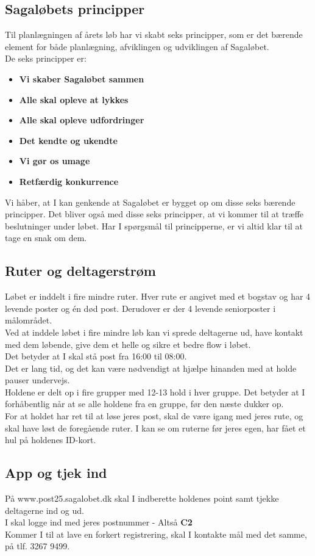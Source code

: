 \subsection{Sagaløbets principper}
Til planlægningen af årets løb har vi skabt seks principper, som er det bærende element for både planlægning, afviklingen og udviklingen af Sagaløbet.\\
De seks principper er:
\begin{itemize}
  \item \textbf{Vi skaber Sagaløbet sammen}
  \item \textbf{Alle skal opleve at lykkes}
  \item \textbf{Alle skal opleve udfordringer}
  \item \textbf{Det kendte og ukendte}
  \item \textbf{Vi gør os umage}
  \item \textbf{Retfærdig konkurrence}
\end{itemize}
Vi håber, at I kan genkende at Sagaløbet er bygget op om disse seks bærende principper. Det bliver også med disse seks principper, at vi kommer til at træffe beslutninger under løbet. Har I spørgsmål til principperne, er vi altid klar til at tage en snak om dem.
\subsection{Ruter og deltagerstrøm}
Løbet er inddelt i fire mindre ruter. Hver rute er angivet med et bogstav og har 4 levende poster og én død post. Derudover er der 4 levende seniorposter i målområdet.\\
Ved at inddele løbet i fire mindre løb kan vi sprede deltagerne ud, have kontakt med dem løbende, give dem et helle og sikre et bedre flow i løbet.\\
\newline
Det betyder at I skal stå post fra 16:00 til 08:00.\\
Det er lang tid, og det kan være nødvendigt at hjælpe hinanden med at holde pauser undervejs.\\
\newline
Holdene er delt op i fire grupper med 12-13 hold i hver gruppe. Det betyder at I forhåbentlig når at se alle holdene fra en gruppe, før den næste dukker op.\\
For at holdet har ret til at løse jeres post, skal de være igang med jeres rute, og skal have løst de foregående ruter. I kan se om ruterne før jeres egen, har fået et hul på holdenes ID-kort.
\subsection{App og tjek ind}
På www.post25.sagalobet.dk skal I indberette holdenes point samt tjekke deltagerne ind og ud.\\
I skal logge ind med jeres postnummer - Altså \textbf{C2}\\
\newline
Kommer I til at lave en forkert registrering, skal I kontakte mål med det samme, på tlf. 3267 9499.
\newpage
\vspace*{.4cm}
